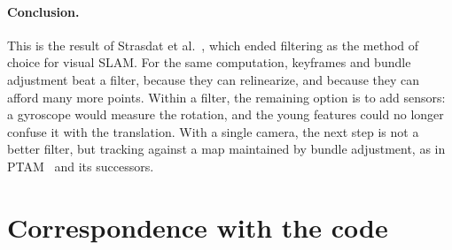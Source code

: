 \documentclass[11pt]{article}
\begin{document}
\paragraph{Conclusion.}
This is the result of Strasdat et al.~\cite{strasdat2012}, which ended filtering as the method of
choice for visual SLAM. For the same computation, keyframes and bundle adjustment beat a filter,
because they can relinearize, and because they can afford many more points. Within a filter, the
remaining option is to add sensors: a gyroscope would measure the rotation, and the young features
could no longer confuse it with the translation. With a single camera, the next step is not a
better filter, but tracking against a map maintained by bundle adjustment, as in PTAM~\cite{klein2007}
and its successors.

\section{Correspondence with the code}
\end{document}
